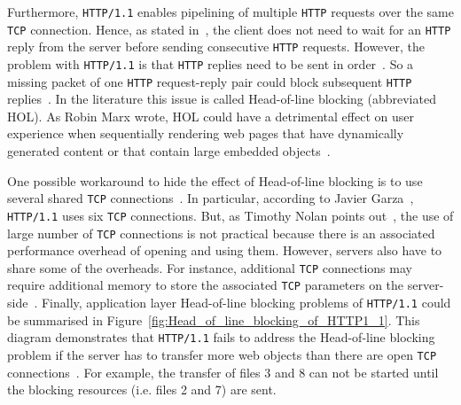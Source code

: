 \documentclass[12pt,a4paper,twoside,openright]{report}
\begin{document}
Furthermore, \texttt{HTTP/1.1} enables pipelining of multiple \texttt{HTTP} requests over the same \texttt{TCP} connection.
Hence, as stated in~\cite{bib_digital_ocean_http11_vs_http2}, the client does not need to wait for an \texttt{HTTP} reply from the server before sending consecutive \texttt{HTTP} requests.
However, the problem with \texttt{HTTP/1.1} is that \texttt{HTTP} replies need to be sent in order~\cite{RFC7540}. 
So a missing packet of one \texttt{HTTP} request-reply pair could block subsequent \texttt{HTTP} replies~\cite{bib_digital_ocean_http11_vs_http2, head-of-line-blocking-in-quic-and-http-3-the-details}.
In the literature this issue is called Head-of-line blocking (abbreviated HOL).
As Robin Marx wrote, HOL could have a detrimental effect on user experience when sequentially rendering web pages that have dynamically generated content or that contain large embedded objects~\cite{head-of-line-blocking-in-quic-and-http-3-the-details}.



One possible workaround to hide the effect of Head-of-line blocking is to use several shared \texttt{TCP} connections~\cite{bib_digital_ocean_http11_vs_http2}.
In particular, according to Javier Garza~\cite{bib_will-http2-make-my-site-faster}, \texttt{HTTP/1.1} uses six \texttt{TCP} connections.
But, as Timothy Nolan points out~\cite{bib_digital_ocean_http11_vs_http2}, the use of large number of \texttt{TCP} connections is not practical because there is an associated performance overhead of opening and using them.
However, servers also have to share some of the overheads.
For instance, additional \texttt{TCP} connections may require additional memory to store the associated \texttt{TCP} parameters on the server-side~\cite{head-of-line-blocking-in-quic-and-http-3-the-details}.
Finally, application layer Head-of-line blocking problems of \texttt{HTTP/1.1} could be summarised in Figure~\ref{fig:Head_of_line_blocking_of_HTTP1_1}.
This diagram demonstrates that \texttt{HTTP/1.1} fails to address the Head-of-line blocking problem if the server has to transfer more web objects than there are open \texttt{TCP} connections~\cite{head-of-line-blocking-in-quic-and-http-3-the-details}.
For example, the transfer of files 3 and 8 can not be started until the blocking resources (i.e. files 2 and 7) are sent. 
\end{document}
